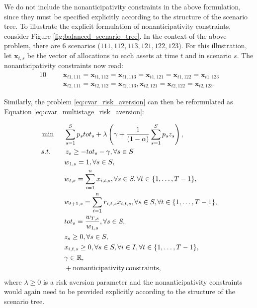 \begin{rem}
We do not include the nonanticipativity constraints in the above formulation, since they must be specified explicitly according to the structure of the scenario tree. To illustrate the explicit formulation of nonanticipativity constraints, consider Figure \ref{fig:balanced_scenario_tree}. In the context of the above problem, there are 6 scenarios ($111, 112, 113, 121, 122, 123$). For this illustration, let $\mathbf{x}_{t,s}$ be the vector of allocations to each assets at time $t$ and in scenario $s$. The nonanticipativity constraints now read:
\begin{alignat}{10}
& && \mathbf{x}_{t1,111}=\mathbf{x}_{t1,112}=\mathbf{x}_{t1,113}=\mathbf{x}_{t1,121}=\mathbf{x}_{t1,122}=\mathbf{x}_{t1,123} \nonumber \\
& && \mathbf{x}_{t2,111}=\mathbf{x}_{t2,112}=\mathbf{x}_{t2,113},\mathbf{x}_{t2,121}=\mathbf{x}_{t2,122}=\mathbf{x}_{t2,123}. \nonumber
\end{alignat}
\end{rem}
Similarly, the problem \ref{eq:cvar_risk_aversion} can then be reformulated as Equation \ref{eq:cvar_multistage_risk_aversion}:

\begin{alignat}{10}
& \min  \, \, \, &&\sum_{s=1}^{S} p_s tot_s + \lambda \left( \gamma + \frac{1}{(1-\alpha)} \sum_{s=1}^S p_s z_s \right), \label{eq:cvar_multistage_risk_aversion}  \\
&s.t. && \, z_s \geq  -tot_s -\gamma, \forall s \in S \nonumber \\
& && w_{1,s}=1, \forall s \in S, \nonumber \\
& && w_{t,s}=\sum_{i=1}^{n} x_{i,t,s}, \forall s \in S, \forall t \in \{1,\dots ,T-1\}, \label{eq:cvar_multistage_expected_return:wealth_distribution_risk_aversion} \\
& && w_{t+1,s}=\sum_{i=1}^{n} r_{i,t,s} x_{i,t,s}, \forall s \in S, \forall t \in \{1,\dots ,T-1\}, \label{eq:cvar_multistage_expected_return:wealth_increases_risk_aversion} \\
& && tot_s = \frac{w_{T,s}}{w_{1,s}}, \forall s \in S, \nonumber \\
& && z_s \geq 0, \forall s \in S, \nonumber \\
& && x_{i,t,s} \geq 0, \forall s \in S, \forall i \in I, \forall t \in \{1,\dots ,T-1\}, \nonumber \\
& && \gamma \in \R ,\nonumber \\
& && + \mathrm{nonanticipativity \, constraints}, \nonumber
\end{alignat}
where $\lambda \geq 0$ is a risk aversion parameter and the nonanticipativity constraints would again need to be provided explicitly according to the structure of the scenario tree.